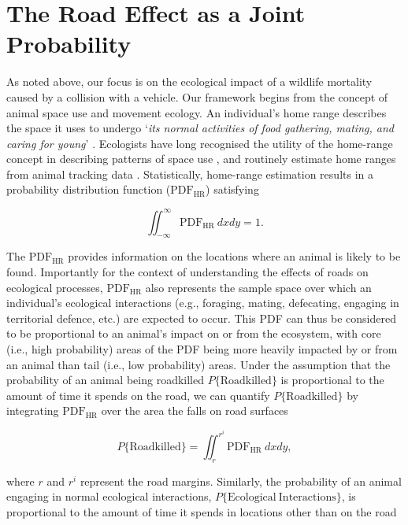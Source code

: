 \documentclass[11pt]{article}
\begin{document}

\section*{The Road Effect as a Joint Probability}

As noted above, our focus is on the ecological impact of a wildlife mortality caused by a collision with a vehicle. Our framework begins from the concept of animal space use and movement ecology. An individual's home range describes the space it uses to undergo `\textit{its normal activities of food gathering, mating, and caring for young}' \citep{Burt:1943he}. Ecologists have long recognised the utility of the home-range concept in describing patterns of space use \citep[e.g.,][]{Kie:2010es}, and routinely estimate home ranges from animal tracking data \citep[see][]{AKDEvsKDE}. Statistically, home-range estimation results in a probability distribution function ($\mathrm{PDF_{HR}}$) satisfying

\begin{equation}
\iint_{-\infty}^\infty \mathrm{PDF_{HR}}~dxdy = 1.
\end{equation}

The $\mathrm{PDF_{HR}}$ provides information on the locations where an animal is likely to be found. Importantly for the context of understanding the effects of roads on ecological processes, $\mathrm{PDF_{HR}}$ also represents the sample space over which an individual's ecological interactions (e.g., foraging, mating, defecating, engaging in territorial defence, etc.) are expected to occur. This PDF can thus be considered to be proportional to an animal's impact on or from the ecosystem, with core (i.e., high probability) areas of the PDF being more heavily impacted by or from an animal than tail (i.e., low probability) areas. Under the assumption that the probability of an animal being roadkilled $P\{\mathrm{Roadkilled}\}$ is proportional to the amount of time it spends on the road, we can quantify $P\{\mathrm{Roadkilled}\}$ by integrating $\mathrm{PDF_{HR}}$ over the area the falls on road surfaces

\begin{equation}
P\{\mathrm{Roadkilled}\} = \iint_{r}^{r^i} \mathrm{PDF_{HR}}~dxdy,
\end{equation}

where $r$ and $r^i$ represent the road margins. Similarly, the probability of an animal engaging in normal ecological interactions, $P\{\mathrm{Ecological~Interactions}\}$, is proportional to the amount of time it spends in locations other than on the road
\end{document}
